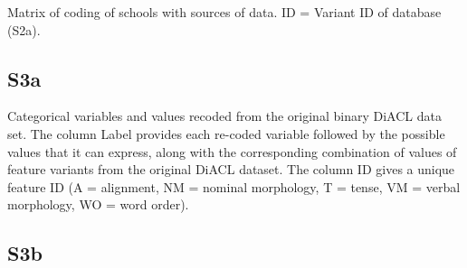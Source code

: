 \documentclass[12pt]{article}
\begin{document}
Matrix of coding of schools with sources of data. ID = Variant ID of database (S2a).



\pagebreak

\subsection*{S3a}

Categorical variables and values recoded from the original binary DiACL data set. The column {\sc Label} provides each re-coded variable followed by the possible values that it can express, along with the corresponding combination of values of feature variants from the original DiACL dataset. The column ID gives a unique feature ID (A = alignment, NM = nominal morphology, T = tense, VM = verbal morphology, WO = word order).





\pagebreak

\subsection*{S3b}
\end{document}
